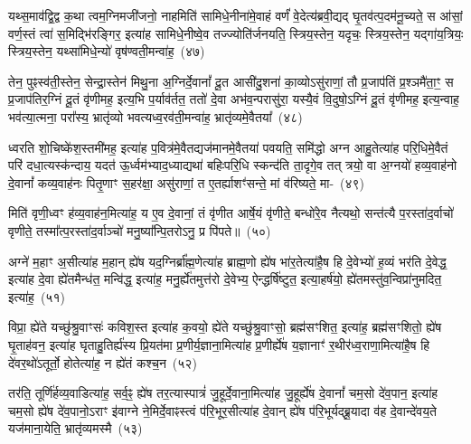 यथ्स॒माव॑द्वि॒द्व क॒था त्वम॒ग्निमजी॑जनो॒ नाहमिति॑ सामिधे॒नीना॑मे॒वाहं वर्णं॑ वे॒देत्य॑ब्रवी॒द्यद् घृ॒तव॑त्प॒दम॑नू॒च्यते॒ स आ॑सां॒ वर्ण॒स्तं त्वा॑ स॒मिद्भि॑रङ्गिर॒ इत्या॑ह सामिधे॒नीष्वे॒व तज्ज्योति॑र्जनयति॒ स्त्रिय॒स्तेन॒ यदृचः॒ स्त्रिय॒स्तेन॒ यद्गा॑य॒त्रियः॒ स्त्रिय॒स्तेन॒ यथ्सा॑मिधे॒न्यो॑ वृष॑ण्वती॒मन्वा॑ह॒~(४७)\ip

तेन॒ पुꣴस्व॑ती॒स्तेन॒ सेन्द्रा॒स्तेन॑ मिथु॒ना अ॒ग्निर्दे॒वानां᳚ दू॒त आसी॑दु॒शना॑ का॒व्यो\-ऽसु॑राणां॒ तौ प्र॒जा\-प॑तिं प्र॒श्ञमै॑ता॒ꣳ॒ स प्र॒जा\-प॑तिर॒ग्निं दू॒तं वृ॑णीमह॒ इत्य॒भि प॒र्याव॑र्तत॒ ततो॑ दे॒वा अभ॑व॒न्परासु॑रा॒ यस्यै॒वं वि॒दुषो॒\-ऽग्निं दू॒तं वृ॑णीमह॒ इत्य॒न्वाह॒ भव॑त्या॒त्मना॒ परा᳚स्य॒ भ्रातृ॑व्यो भवत्यध्व॒रव॑ती॒मन्वा॑ह॒ भ्रातृ॑व्यमे॒वैतया᳚~(४८)\ip

ध्वरति शो॒चिष्के॑श॒स्तमी॑मह॒ इत्या॑ह प॒वित्र॑मे॒वैतद्यज॑\-मान\-मे॒वै\-तया॑ पवयति॒ समि॑द्धो अग्न आहु॒तेत्या॑ह परि॒धिमे॒वैतं परि॑ दधा॒\-त्य\-स्क॑न्दाय॒ यदत॑ ऊ॒र्ध्वम॑भ्याद॒ध्याद्यथा॑ बहिःपरि॒धि स्कन्द॑ति ता॒दृगे॒व तत् त्रयो॒ वा अ॒ग्नयो॑ हव्य॒वाह॑नो दे॒वानां᳚ कव्य॒वाह॑नः पितृ॒णाꣳ स॒हर॑क्षा॒ असु॑राणां॒ त ए॒तर्\mbox{}ह्याशꣳ॑सन्ते॒ मां व॑रिष्यते॒ मा-~(४९)\ip

मिति॑ वृणी॒ध्वꣳ ह॑व्य॒वाह॑न॒मित्या॑ह॒ य ए॒व दे॒वानां॒ तं वृ॑णीत आर्\mbox{}षे॒यं वृ॑णीते॒ बन्धो॑रे॒व नैत्यथो॒ सन्त॑त्यै प॒रस्ता॑द॒र्वाचो॑ वृणीते॒ तस्मा᳚त्प॒रस्ता॑द॒र्वाञ्चो॑ मनु॒ष्या᳚न्पि॒तरो\-ऽनु॒ प्र पि॑पते॥~(५०)\ip

{\anuvakamend[{अशा᳚न्तावाह॒ पञ्च॑दशाब्रवी॒दन्वा॑है॒तया॑ वरिष्यते॒ मामेका॒न्नत्रि॒ꣳ॒शच्च॑}]}

अग्ने॑ म॒हाꣳ अ॒सीत्या॑ह म॒हान् ह्ये॑ष यद॒ग्निर्ब्रा᳚ह्म॒णेत्या॑ह ब्राह्म॒णो ह्ये॑ष भा॑र॒तेत्या॑है॒ष हि दे॒वेभ्यो॑ ह॒व्यं भर॑ति दे॒वेद्ध॒ इत्या॑ह दे॒वा ह्ये॑तमैन्ध॑त॒ मन्वि॑द्ध॒ इत्या॑ह॒ मनु॒र्ह्ये॑तमुत्त॑रो दे॒वेभ्य॒ ऐन्द्धर्\mbox{}षि॑ष्टुत॒ इत्या॒हर्\mbox{}ष॑यो॒ ह्ये॑तमस्तु॑व॒न्विप्रा॑नुमदित॒ इत्या॑ह॒~(५१)\ip

विप्रा॒ ह्ये॑ते यच्छु॑श्रु॒वाꣳसः॑ कविश॒स्त इत्या॑ह क॒वयो॒ ह्ये॑ते यच्छु॑श्रु॒वाꣳसो॒ ब्रह्म॑सꣳशित॒ इत्या॑ह॒ ब्रह्म॑सꣳशितो॒ ह्ये॑ष घृ॒ताह॑वन॒ इत्या॑ह घृताहु॒तिर्\mbox{}ह्य॑स्य प्रि॒यत॑मा प्र॒णीर्य॒ज्ञाना॒मित्या॑ह प्र॒णीर्\mbox{}ह्ये॑ष य॒ज्ञानाꣳ॑ र॒थीर॑ध्व॒राणा॒मित्या॑है॒ष हि दे॑वर॒थो॑\-ऽतूर्तो॒ होतेत्या॑ह॒ न ह्ये॑तं कश्च॒न~(५२)\ip

तर॑ति॒ तूर्णि॑र्\mbox{}हव्य॒वाडित्या॑ह॒ सर्व॒ꣴ॒ ह्ये॑ष तर॒त्यास्पात्रं॑ जु॒हूर्दे॒वा\-ना॒\-मि\-त्या॑ह जु॒हूर्\mbox{}ह्ये॑ष दे॒वानां᳚ चम॒सो दे॑व॒पान॒ इत्या॑ह चम॒सो ह्ये॑ष दे॑व॒पानो॒\-ऽराꣳ इ॑वाग्ने ने॒मिर्दे॒वाꣴस्त्वं प॑रि॒भूर॒सीत्या॑ह दे॒वान् ह्ये॑ष प॑रि॒\-भूर्यद्ब्रू॒\-यादा व॑ह दे॒वान्दे॑वय॒ते यज॑माना॒येति॒ भ्रातृ॑व्यमस्मै~(५३)\ip


